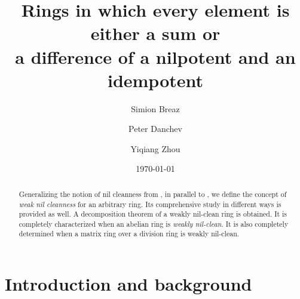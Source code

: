 \documentclass[12]{amsart}
\theoremstyle{definition}
\numberwithin{equation}{section}
\begin{document}
\title[Weakly nil-clean rings]{Rings in which every element is either a sum or \\ a difference of a nilpotent and an idempotent}

\date{\today}

\author{Simion Breaz}
\address{Faculty of Mathematics
and Computer Science, Babe\c s-Bolyai University, 400084 Cluj-Napoca, Romania}
\author{Peter Danchev}
\address{Department of Mathematics, Plovdiv University, 4000 Plovdiv, Bulgaria}
\author{Yiqiang Zhou}
\address{Department of Mathematics and Statistics, Memorial University of Newfoundland,
St. John's NFLD A1C 5S7, Canada}


\baselineskip=20pt

\begin{abstract}
{Generalizing the notion of nil cleanness from \cite{D13}, in parallel to \cite{DM14}, we define the concept of {\it weak nil cleanness} for an arbitrary ring. Its comprehensive study in different ways is provided as well. A decomposition theorem of a weakly nil-clean ring is obtained. It is completely characterized when an abelian ring is {\it weakly nil-clean}.} It is also completely determined when a matrix ring over a division ring is weakly nil-clean.
\end{abstract}

\maketitle

\section{Introduction and background}
\end{document}
